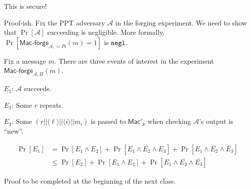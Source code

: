 \documentclass[12pt]{article}
\newcommand{\AAA}{\mathcal{A}}
\newcommand{\Mac}{\mathsf{Mac}}
\newcommand{\Macf}{\mathsf{Mac\text{-}forge}}
\newcommand{\ang}[1]{\langle#1\rangle}
\newcommand{\negl}{{\tt negl}}
\begin{document}
This is secure!

Proof-ish. Fix the PPT adversary $\AAA$ in the forging experiment. We need to show that $\Pr[\AAA]$ succeeding is negligible. More formally, $\Pr[\Macf_{\AAA,=Pi}(m)=1]$ is $\negl$.

Fix a message $m$. There are three events of interest in the experiment $\Macf_{\AAA,\Pi}(m)$.

$E_1$: $\AAA$ succeeds.

$E_2$: Some $r$ repeats.

$E_3$: Some $(r||\ang{\ell}||\ang{i}||m_i)$ is passed to $\Mac'_k$ when checking $\AAA$'s output is ``new''.

\begin{align*}
\Pr[E_1]&=\Pr[E_1\wedge E_2]+\Pr[E_1\wedge\overline{E_2}\wedge E_3]+\Pr[E_1\wedge\overline{E_2}\wedge\overline{E_3}]\\
&\leq\Pr[E_2]+\Pr[E_1\wedge E_3]+\Pr[E_1\wedge\overline{E_2}\wedge\overline{E_3}]
\end{align*}

Proof to be completed at the beginning of the next class.
\end{document}
